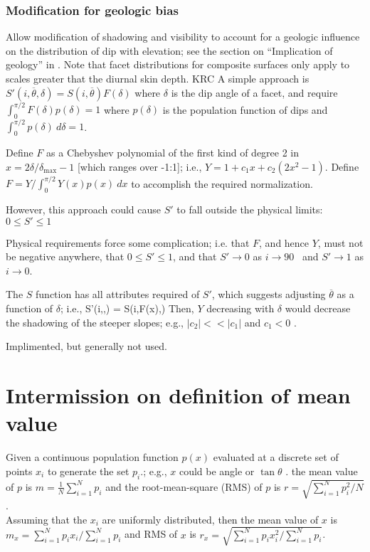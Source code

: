 \documentclass{article}
\begin{document}
\subsubsection{Modification for geologic bias} %

Allow modification of shadowing and visibility to account for a geologic influence on the
distribution of dip with elevation; see the section on ``Implication of
geology'' in . Note that facet distributions for composite surfaces only apply to scales greater that the diurnal skin depth. KRC     A simple approach is $
S'(i,\overline{\theta},\delta) = S(i,\overline{\theta}) F(\delta)$ where
$\delta$ is the dip angle of a facet, and require $\int_0^{\pi/2}
F(\delta)p(\delta) =1$ where $p(\delta)$ is the population function of dips and
$\int_0^{\pi/2} p(\delta) \ d\delta =1$.

Define $F$ as a Chebyshev polynomial of the first kind of degree 2 in
$x=2\delta/\delta_\mathrm{max} -1$ [which ranges over -1:1]; i.e.,
$Y=1+c_1x+c_2(2x^2-1)$. Define $F=Y/\int_0^{\pi/2} Y(x)p(x)\ dx $ to accomplish
the required normalization.

However, this approach could cause $S'$ to fall outside the physical limits: $ 0
\leq S' \leq 1$

Physical requirements force some complication; i.e. that $F$, and hence $Y$,
must not be negative anywhere, that $ 0 \leq S' \leq 1$, and that $S'
\rightarrow 0$ as $i \rightarrow 90$\qd~ and $S' \rightarrow 1$ as $i
\rightarrow 0$.

 The $S$ function has all attributes required of $S'$, which suggests adjusting
 $\overline{\theta}$ as a function of $\delta$; i.e., \qbn
 S'(i,\overline{\theta},\delta) = S(i,F(x)\overline{\theta},\delta) \qen Then,
 $Y$ decreasing with $\delta$ would decrease the shadowing of the steeper
 slopes; e.g., $|c_2| << |c_1| $ and $c_1 < 0$ .

Implimented, but generally not used.

\section{Intermission on definition of mean value}

Given a continuous population function $p(x)$ evaluated at a discrete set of points $x_i$ to generate the set $p_i$.; e.g., $x$ could be angle or $\tan \theta$ .
\qi the mean value of $p$ is $ m=\frac{1}{N} \sum_{i=1}^N p_i $ and
 the root-mean-square (RMS) of $p$ is $ r=\sqrt{ \sum_{i=1}^N p_i^2 \big/ N }$.
\\ Assuming that the $x_i$ are uniformly distributed, then
\qi the mean value of $x$ is $ m_x=\sum_{i=1}^N p_i x_i \big/ \sum_{i=1}^N p_i $ 
and RMS of $x$ is 
$ r_x=\sqrt{ \sum_{i=1}^N p_i  x^2_i  \big/ \sum_{i=1}^N p_i }$.
\end{document}
